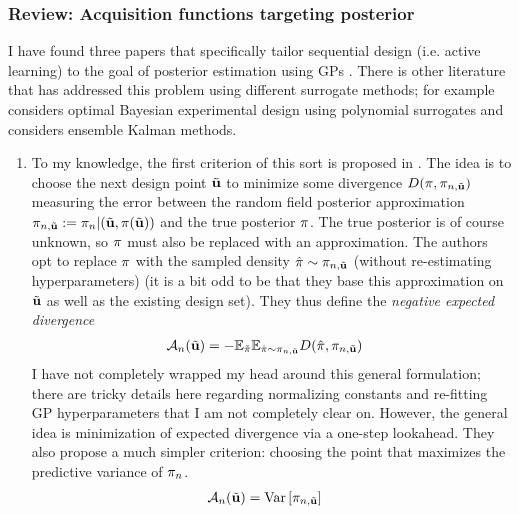 \documentclass[12pt]{article}
\begin{document}
\subsubsection{Review: Acquisition functions targeting posterior}
I have found three papers that specifically tailor sequential design (i.e. active learning) to the goal of posterior estimation using GPs 
\cite{SinsbeckNowak, Surer2023sequential, Kandasamy_active_learning}. 
There is other literature that 
has addressed this problem using different surrogate methods; for example \cite{Huan2013} considers optimal Bayesian experimental design using polynomial surrogates and \cite{Cleary2021} considers ensemble Kalman methods. 
\begin{enumerate}
\item To my knowledge, the first criterion of this sort is proposed in \cite{KandasamyActiveLearning2015}. The idea is to choose the next design point $\tilde{\bpar}$ to minimize
some divergence $D(\postDens, \indexDesign[\designIdx, \tilde{\bpar}]{\postDens})$ measuring the error between the random field posterior approximation 
$\indexDesign[\designIdx, \tilde{\bpar}]{\postDens} := \indexDesign{\postDens} | (\tilde{\bpar}, \postDens(\tilde{\bpar}))$ and the true posterior $\postDens$. The true posterior is 
of course unknown, so $\postDens$ must also be replaced with an approximation. The authors opt to replace $\postDens$ with the sampled density 
$\hat{\postDens} \sim \indexDesign[\designIdx, \tilde{\bpar}]{\postDens}$ (without re-estimating hyperparameters) (it is a bit odd to be that they base this approximation 
on $\tilde{\bpar}$ as well as the existing design set). They thus define the \textit{negative expected divergence}
\begin{align}
\acq[\designIdx](\tilde{\bpar}) &= -\E_{\tilde{\postDens}} \E_{\hat{\postDens} \sim \indexDesign[\designIdx, \tilde{\bpar}]{\postDens}} D(\hat{\postDens}, \indexDesign[\designIdx, \tilde{\bpar}]{\postDens})
\end{align}
I have not completely wrapped my head around this general formulation; there are tricky details here regarding normalizing constants and re-fitting GP hyperparameters 
that I am not completely clear on. However, the general idea is minimization of expected divergence via a one-step lookahead. They also propose a much simpler 
criterion: choosing the point that maximizes the predictive variance of $\indexDesign{\postDens}$. 
\begin{align}
\acq[\designIdx](\tilde{\bpar}) &= \Var\left[\indexDesign[\designIdx, \tilde{\bpar}]{\postDens} \right]
\end{align}


\end{enumerate}
\end{document}
